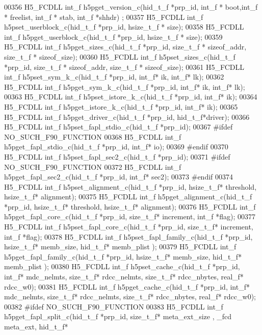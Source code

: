 \begin{DoxyCode}
00356 H5\_FCDLL int\_f h5pget\_version\_c(hid\_t\_f *prp\_id, int\_f * boot,int\_f * freelist, int\_f * stab, int\_f *shhdr)
      ;
00357 H5\_FCDLL int\_f h5pset\_userblock\_c(hid\_t\_f *prp\_id, hsize\_t\_f * size);
00358 H5\_FCDLL int\_f h5pget\_userblock\_c(hid\_t\_f *prp\_id, hsize\_t\_f * size);
00359 H5\_FCDLL int\_f h5pget\_sizes\_c(hid\_t\_f *prp\_id, size\_t\_f * sizeof\_addr, size\_t\_f * sizeof\_size);
00360 H5\_FCDLL int\_f h5pset\_sizes\_c(hid\_t\_f *prp\_id, size\_t\_f * sizeof\_addr, size\_t\_f * sizeof\_size);
00361 H5\_FCDLL int\_f h5pset\_sym\_k\_c(hid\_t\_f *prp\_id, int\_f* ik, int\_f* lk);
00362 H5\_FCDLL int\_f h5pget\_sym\_k\_c(hid\_t\_f *prp\_id, int\_f* ik, int\_f* lk);
00363 H5\_FCDLL int\_f h5pset\_istore\_k\_c(hid\_t\_f *prp\_id, int\_f* ik);
00364 H5\_FCDLL int\_f h5pget\_istore\_k\_c(hid\_t\_f *prp\_id, int\_f* ik);
00365 H5\_FCDLL int\_f h5pget\_driver\_c(hid\_t\_f *prp\_id, hid\_t\_f*driver);
00366 H5\_FCDLL int\_f h5pset\_fapl\_stdio\_c(hid\_t\_f *prp\_id);
00367 \textcolor{preprocessor}{#ifdef NO\_SUCH\_F90\_FUNCTION}
00368 H5\_FCDLL int\_f h5pget\_fapl\_stdio\_c(hid\_t\_f *prp\_id, int\_f* io);
00369 \textcolor{preprocessor}{#endif}
00370 H5\_FCDLL int\_f h5pset\_fapl\_sec2\_c(hid\_t\_f *prp\_id);
00371 \textcolor{preprocessor}{#ifdef NO\_SUCH\_F90\_FUNCTION}
00372 H5\_FCDLL int\_f h5pget\_fapl\_sec2\_c(hid\_t\_f *prp\_id, int\_f* sec2);
00373 \textcolor{preprocessor}{#endif}
00374 H5\_FCDLL int\_f h5pset\_alignment\_c(hid\_t\_f *prp\_id, hsize\_t\_f* threshold, hsize\_t\_f* alignment);
00375 H5\_FCDLL int\_f h5pget\_alignment\_c(hid\_t\_f *prp\_id, hsize\_t\_f* threshold, hsize\_t\_f* alignment);
00376 H5\_FCDLL int\_f h5pget\_fapl\_core\_c(hid\_t\_f *prp\_id, size\_t\_f* increment, int\_f *flag);
00377 H5\_FCDLL int\_f h5pset\_fapl\_core\_c(hid\_t\_f *prp\_id, size\_t\_f* increment, int\_f *flag);
00378 H5\_FCDLL int\_f h5pset\_fapl\_family\_c(hid\_t\_f *prp\_id, hsize\_t\_f* memb\_size, hid\_t\_f* memb\_plist );
00379 H5\_FCDLL int\_f h5pget\_fapl\_family\_c(hid\_t\_f *prp\_id, hsize\_t\_f* memb\_size, hid\_t\_f* memb\_plist );
00380 H5\_FCDLL int\_f h5pset\_cache\_c(hid\_t\_f *prp\_id, int\_f* mdc\_nelmts, size\_t\_f* rdcc\_nelmts, size\_t\_f* 
      rdcc\_nbytes, real\_f* rdcc\_w0);
00381 H5\_FCDLL int\_f h5pget\_cache\_c(hid\_t\_f *prp\_id, int\_f* mdc\_nelmts, size\_t\_f* rdcc\_nelmts, size\_t\_f* 
      rdcc\_nbytes, real\_f* rdcc\_w0);
00382 \textcolor{preprocessor}{#ifdef NO\_SUCH\_F90\_FUNCTION}
00383 H5\_FCDLL int\_f h5pget\_fapl\_split\_c(hid\_t\_f *prp\_id, size\_t\_f* meta\_ext\_size , \_fcd meta\_ext, hid\_t\_f* 

\end{DoxyCode}
